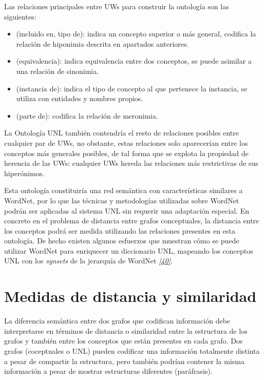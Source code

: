 \documentclass[a4paper,12pt,spanish]{book}
\begin{document}
Las relaciones principales entre UWs para construir la ontología son las siguientes:
\begin{itemize}
\item {} 
 (incluido en, tipo de): indica un concepto superior o más general, codifica la
relación de hiponimia descrita en apartados anteriores.

\item {} 
 (equivalencia): indica equivalencia entre dos conceptos, se puede asimilar a
una relación de sinonimia.

\item {} 
 (instancia de): indica el tipo de concepto al que pertenece la instancia, se
utiliza con entidades y nombres propios.

\item {} 
 (parte de): codifica la relación de meronimia.

\end{itemize}

La Ontología UNL también contendría el resto de relaciones posibles entre cualquier par de
UWs, no obstante, estas relaciones solo aparecerían entre los conceptos más generales posibles,
de tal forma que se explota la propiedad de herencia de las UWs: cualquier UWs hereda las
relaciones más restrictivas de sus hiperónimos.

Esta ontología constituiría una red semántica con características similares a WordNet, por lo
que las técnicas y metodologías utilizadas sobre WordNet podrán ser aplicadas al sistema UNL
sin requerir una adaptación especial. En concreto en el problema de distancia entre grafos
conceptuales, la distancia entre los conceptos podrá ser medida utilizando las relaciones
presentes en esta ontología.
De hecho existen algunos esfuerzos que muestran cómo se puede utilizar WordNet para enriquecer
un diccionario UNL, mapeando los conceptos UNL con los \emph{synsets} de la jerarquía de
WordNet \label{1.state-of-the-art/i.representacion-conocimiento:id59}{\hyperref[zreferences:iraola2003]{\emph{{[}40{]}}}}.


\section{Medidas de distancia y similaridad}
\label{1.state-of-the-art/ii.medidas-distancia::doc}\label{1.state-of-the-art/ii.medidas-distancia:medidas-de-distancia-y-similaridad}
La diferencia semántica entre dos grafos que codifican información debe interpretarse en
términos de distancia o similaridad entre la estructura de los grafos y también entre los
conceptos que están presentes en cada grafo. Dos grafos (coceptuales o UNL) pueden
codificar una información totalmente distinta a pesar de compartir la estructura, pero
también podrían contener la misma información a pesar de mostrar estructuras
diferentes (paráfrasis).
\end{document}
